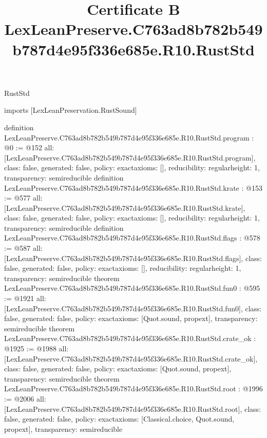 \begin{lexlean}{RustStd}
\title{Certificate B LexLeanPreserve.C763ad8b782b549b787d4e95f336e685e.R10.RustStd}
\begin{coremodule}
imports [LexLeanPreservation.RustSound]

definition LexLeanPreserve.C763ad8b782b549b787d4e95f336e685e.R10.RustStd.program : @0 := @152 {
  all: [LexLeanPreserve.C763ad8b782b549b787d4e95f336e685e.R10.RustStd.program],
  class: false,
  generated: false,
  policy: exact{axioms: []},
  reducibility: regular{height: 1},
  transparency: semireducible
}
definition LexLeanPreserve.C763ad8b782b549b787d4e95f336e685e.R10.RustStd.krate : @153 := @577 {
  all: [LexLeanPreserve.C763ad8b782b549b787d4e95f336e685e.R10.RustStd.krate],
  class: false,
  generated: false,
  policy: exact{axioms: []},
  reducibility: regular{height: 1},
  transparency: semireducible
}
definition LexLeanPreserve.C763ad8b782b549b787d4e95f336e685e.R10.RustStd.flags : @578 := @587 {
  all: [LexLeanPreserve.C763ad8b782b549b787d4e95f336e685e.R10.RustStd.flags],
  class: false,
  generated: false,
  policy: exact{axioms: []},
  reducibility: regular{height: 1},
  transparency: semireducible
}
theorem LexLeanPreserve.C763ad8b782b549b787d4e95f336e685e.R10.RustStd.fun0 : @595 := @1921 {
  all: [LexLeanPreserve.C763ad8b782b549b787d4e95f336e685e.R10.RustStd.fun0],
  class: false,
  generated: false,
  policy: exact{axioms: [Quot.sound, propext]},
  transparency: semireducible
}
theorem LexLeanPreserve.C763ad8b782b549b787d4e95f336e685e.R10.RustStd.crate_ok : @1925 := @1988 {
  all: [LexLeanPreserve.C763ad8b782b549b787d4e95f336e685e.R10.RustStd.crate_ok],
  class: false,
  generated: false,
  policy: exact{axioms: [Quot.sound, propext]},
  transparency: semireducible
}
theorem LexLeanPreserve.C763ad8b782b549b787d4e95f336e685e.R10.RustStd.root : @1996 := @2006 {
  all: [LexLeanPreserve.C763ad8b782b549b787d4e95f336e685e.R10.RustStd.root],
  class: false,
  generated: false,
  policy: exact{axioms: [Classical.choice, Quot.sound, propext]},
  transparency: semireducible
}


\end{coremodule}
\end{lexlean}
